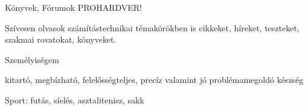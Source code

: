 

\begin{cventries}

  \cventry
    {Könyvek, Fórumok} %
    {} %
    {PROHARDVER!} %
    {} %
    {
      \begin{cvitems} %
        \item {Szívesen olvasok számítástechnikai témakörökben is cikkeket, híreket, teszteket, szakmai rovatokat, könyveket.}
      \end{cvitems}
    }

  \cventry
    {Személyiségem} %
    {} %
    {} %
    {} %
    {
      \begin{cvitems} %
        \item {kitartó, megbízható, felelősségteljes, precíz valamint jó problémamegoldó készség}
        \item {Sport: futás, síelés, asztalitenisz, sakk}
      \end{cvitems}
    }

\end{cventries}
